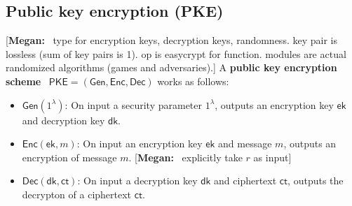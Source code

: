 \documentclass[11pt,letterpaper]{article}
\renewcommand{\emph}[1]{\textbf{#1}~}
\newcommand{\authnote}[2]{[{\color{red}\textbf{#1:}}~{\color{blue} #2}]}
\newcommand{\authnote}[2]{}
\newcommand{\megan}[1]{\authnote{Megan}{#1}}
\theoremstyle{plain} %
\theoremstyle{definition} %
\theoremstyle{remark} %
\newcommand{\SecParam}{\lambda}
\newcommand{\PKE}{\mathsf{PKE}}
\newcommand{\Gen}{\mathsf{Gen}}
\newcommand{\Enc}{\mathsf{Enc}}
\newcommand{\Dec}{\mathsf{Dec}}
\newcommand{\EncKey}{\mathsf{ek}}
\newcommand{\DecKey}{\mathsf{dk}}
\newcommand{\Msg}{m}
\newcommand{\Ct}{\mathsf{ct}}
\newcommand{\Rand}{r}
\begin{document}
\subsection{Public key encryption (PKE)}

\megan{type for encryption keys, decryption keys, randomness. key pair is lossless (sum of key pairs is 1). op is easycrypt for function. modules are actual randomized algorithms (games and adversaries).}
A \emph{public key encryption scheme} $\PKE = (\Gen, \Enc, \Dec)$ works as follows:
\begin{itemize}
	\item $\Gen(1^\SecParam)$: On input a security parameter $1^\SecParam$, outputs an encryption key $\EncKey$ and decryption key $\DecKey$.
	\item $\Enc(\EncKey,\Msg)$: On input an encryption key $\EncKey$ and message $\Msg$, outputs an encryption of message $\Msg$. \megan{explicitly take $\Rand$ as input}
	\item $\Dec(\DecKey,\Ct)$: On input a decryption key $\DecKey$ and ciphertext $\Ct$, outputs the decrypton of a ciphertext $\Ct$.
\end{itemize}
\end{document}
